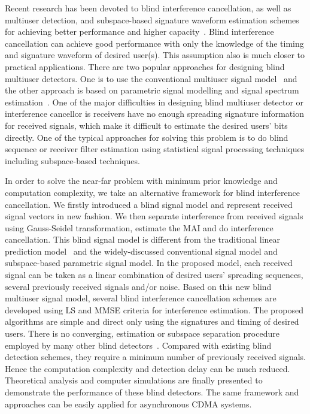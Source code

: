 \documentclass[a4paper,10pt,fleqn, twocolumn]{IEEETran}
\begin{document}
Recent research has been devoted to blind interference
cancellation, as well as multiuser detection, and subspace-based
signature waveform estimation schemes for achieving better
performance and higher
capacity~\cite{Madh94,Honi95,Torl97,Wang98,Wang99,Zhang02}. Blind
interference cancellation can achieve good performance with only
the knowledge of the timing and signature waveform of desired
user(s). This assumption also is much closer to practical
applications. There are two popular approaches for designing blind
multiuser detectors. One is to use the conventional multiuser
signal model~\cite{Verd98,Madh94,Honi95,Zhang02} and the other
approach is based on parametric signal modelling and signal
spectrum estimation~\cite{Wang98,Wang99}. One of the major
difficulties in designing blind multiuser detector or interference
cancellor is receivers have no enough spreading signature
information for received signals, which make it difficult to
estimate the desired users' bits directly. One of the typical
approaches for solving this problem is to do blind sequence or
receiver filter estimation using statistical signal processing
techniques including subspace-based techniques.

In order to solve the near-far problem with minimum prior
knowledge and computation complexity, we take an alternative
framework for blind interference cancellation. We firstly
introduced a blind signal model and represent received signal
vectors in new fashion. We then separate interference from
received signals using Gauss-Seidel transformation, estimate the
MAI and do interference cancellation. This blind signal model is
different from the traditional linear prediction
model~\cite{Haykin96} and the widely-discussed conventional signal
model and subspace-based parametric signal model. In the proposed
model, each received signal can be taken as a linear combination
of desired users' spreading sequences, several previously received
signals and/or noise. Based on this new blind multiuser signal
model, several blind interference cancellation schemes are
developed using LS and MMSE criteria for interference estimation.
The proposed algorithms are simple and direct only using the
signatures and timing of desired users. There is no converging,
estimation or subspace separation procedure employed by many other
blind detectors~\cite{Madh94,Honi95,Wang98,Wang99}. Compared with
existing blind detection schemes, they require a minimum number of
previously received signals. Hence the computation complexity and
detection delay can be much reduced. Theoretical analysis and
computer simulations are finally presented to demonstrate the
performance of these blind detectors. The same framework and
approaches can be easily applied for asynchronous CDMA systems.
\end{document}
